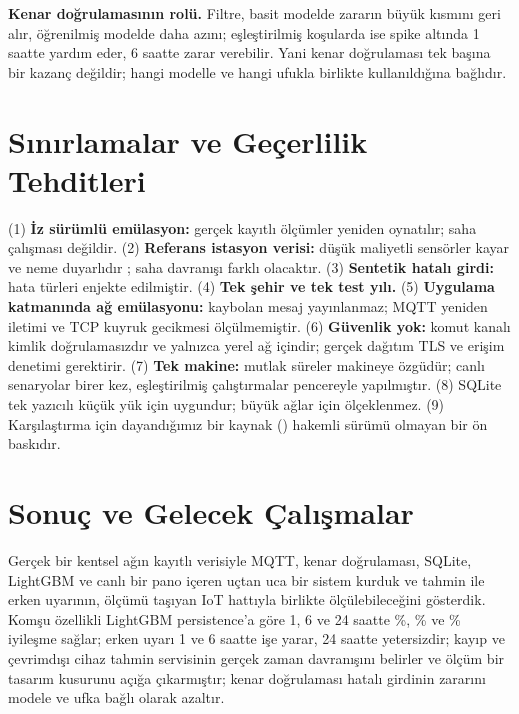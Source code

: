 \documentclass[conference]{IEEEtran}
\begin{document}
\textbf{Kenar doğrulamasının rolü.} Filtre, basit modelde zararın büyük kısmını geri alır, öğrenilmiş modelde daha azını; eşleştirilmiş koşularda ise spike altında 1 saatte yardım eder, 6 saatte zarar verebilir. Yani kenar doğrulaması tek başına bir kazanç değildir; hangi modelle ve hangi ufukla birlikte kullanıldığına bağlıdır.

\section{Sınırlamalar ve Geçerlilik Tehditleri}\label{sec:limits}
(1) \textbf{İz sürümlü emülasyon:} gerçek kayıtlı ölçümler yeniden oynatılır; saha çalışması değildir. (2) \textbf{Referans istasyon verisi:} düşük maliyetli sensörler kayar ve neme duyarlıdır \cite{R1,R20}; saha davranışı farklı olacaktır. (3) \textbf{Sentetik hatalı girdi:} hata türleri enjekte edilmiştir. (4) \textbf{Tek şehir ve tek test yılı.} (5) \textbf{Uygulama katmanında ağ emülasyonu:} kaybolan mesaj yayınlanmaz; MQTT yeniden iletimi ve TCP kuyruk gecikmesi ölçülmemiştir. (6) \textbf{Güvenlik yok:} komut kanalı kimlik doğrulamasızdır ve yalnızca yerel ağ içindir; gerçek dağıtım TLS ve erişim denetimi gerektirir. (7) \textbf{Tek makine:} mutlak süreler makineye özgüdür; canlı senaryolar birer kez, eşleştirilmiş çalıştırmalar \nAbSpikeWindows{} pencereyle yapılmıştır. (8) SQLite tek yazıcılı küçük yük için uygundur; büyük ağlar için ölçeklenmez. (9) Karşılaştırma için dayandığımız bir kaynak (\cite{R13}) hakemli sürümü olmayan bir ön baskıdır.

\section{Sonuç ve Gelecek Çalışmalar}
Gerçek bir kentsel ağın kayıtlı verisiyle MQTT, kenar doğrulaması, SQLite, LightGBM ve canlı bir pano içeren uçtan uca bir sistem kurduk ve tahmin ile erken uyarının, ölçümü taşıyan IoT hattıyla birlikte ölçülebileceğini gösterdik. Komşu özellikli LightGBM persistence'a göre 1, 6 ve 24 saatte \%\nImprMtwobHOne{}, \%\nImprMtwobHSix{} ve \%\nImprMtwobHTwentyFour{} iyileşme sağlar; erken uyarı 1 ve 6 saatte işe yarar, 24 saatte yetersizdir; kayıp ve çevrimdışı cihaz tahmin servisinin gerçek zaman davranışını belirler ve ölçüm bir tasarım kusurunu açığa çıkarmıştır; kenar doğrulaması hatalı girdinin zararını modele ve ufka bağlı olarak azaltır.
\end{document}
